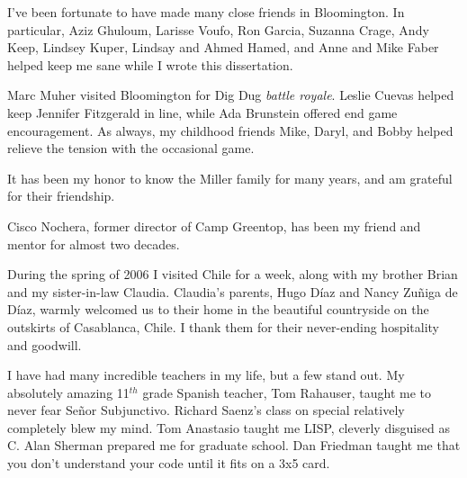 
I've been fortunate to have made many close friends in Bloomington.
In particular, Aziz Ghuloum, Larisse Voufo, Ron Garcia, Suzanna Crage,
Andy Keep, Lindsey Kuper, Lindsay and Ahmed Hamed, and Anne and Mike
Faber helped keep me sane while I wrote this dissertation.

Marc Muher visited Bloomington for Dig Dug \emph{battle royale}.
Leslie Cuevas helped keep Jennifer Fitzgerald in line, while Ada
Brunstein offered end game encouragement.  As always, my childhood
friends Mike, Daryl, and Bobby helped relieve the tension with the
occasional game.

It has been my honor to know the Miller family for many years, and am
grateful for their friendship.

Cisco Nochera, former director of Camp Greentop, has been my friend
and mentor for almost two decades.

During the spring of 2006 I visited Chile for a week, along with my
brother Brian and my sister-in-law Claudia.  Claudia's parents, Hugo
D\'{i}az and Nancy Zu\~{n}iga de D\'{i}az, warmly welcomed us to their
home in the beautiful countryside on the outskirts of Casablanca,
Chile.  I thank them for their never-ending hospitality and goodwill.

I have had many incredible teachers in my life, but a few stand out.
My absolutely amazing 11$^{th}$ grade Spanish teacher, Tom Rahauser,
taught me to never fear Se\~{n}or Subjunctivo.  Richard Saenz's class
on special relatively completely blew my mind.  Tom Anastasio taught
me LISP, cleverly disguised as C.  Alan Sherman prepared me for
graduate school.  Dan Friedman taught me that you don't understand
your code until it fits on a 3x5 card.
